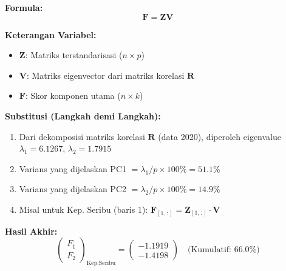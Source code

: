 \documentclass[11pt,a4paper]{article}
\begin{document}
\begin{tcolorbox}[formula_box, title={23. PCA ($\mathbf{F}=\mathbf{Z}\mathbf{V}$)}]
\textbf{Formula:}
\[ \mathbf{F} = \mathbf{Z}\mathbf{V} \]

\textbf{Keterangan Variabel:}
\begin{itemize}
  \item $\mathbf{Z}$: Matriks terstandarisasi ($n\times p$)
  \item $\mathbf{V}$: Matriks eigenvector dari matriks korelasi $\mathbf{R}$
  \item $\mathbf{F}$: Skor komponen utama ($n\times k$)
\end{itemize}

\textbf{Substitusi (Langkah demi Langkah):}
\begin{enumerate}
  \item Dari dekomposisi matriks korelasi $\mathbf{R}$ (data 2020), diperoleh eigenvalue $\lambda_1=6.1267$, $\lambda_2=1.7915$
  \item Varians yang dijelaskan PC1 $= \lambda_1 / p \times 100\% = 51.1\%$
  \item Varians yang dijelaskan PC2 $= \lambda_2 / p \times 100\% = 14.9\%$
  \item Misal untuk Kep. Seribu (baris 1): $\mathbf{F}_{[1,:]} = \mathbf{Z}_{[1,:]} \cdot \mathbf{V}$
\end{enumerate}

\textbf{Hasil Akhir:}
\[ \begin{pmatrix} F_1 \\ F_2 \end{pmatrix}_{\text{Kep.Seribu}} = \begin{pmatrix} -1.1919 \\ -1.4198 \end{pmatrix} \quad \text{(Kumulatif: 66.0\%)} \]
\end{tcolorbox}
\end{document}
